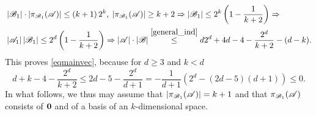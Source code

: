         \begin{align}
            & \left|{\mathscr{B}}_1\right|\cdot\left|\pi_{{\mathscr{B}}_1}({\mathscr{A}})\right|\leq\left(k+1\right)2^k,\;\left|\pi_{{\mathscr{B}}_1}({\mathscr{A}})\right|\geq k+2 \Rightarrow \left|{\mathscr{B}}_1\right| \leq 2^k\left(1-\frac{1}{k+2}\right) \Rightarrow \nonumber \\
            & \left|{\mathscr{A}}_1\right|\left|{\mathscr{B}}_1\right| \leq 2^d\left(1-\frac{1}{k+2}\right) \Rightarrow \left|{\mathscr{A}}\right|\cdot\left|{\mathscr{B}}\right|\stackrel{\eqref{general_ind}}{\leq} d 2^d + 4d-4- \frac{2^d}{k+2}-(d-k). \nonumber
        \end{align}
        This proves \eqref{eqmainvec}, because for $d \geq 3$ and $k < d$
        \begin{equation*}
            d+k-4-\frac{2^d}{k+2}\leq2d-5-\frac{2^d}{d+1}=-\frac{1}{d+1}\left(2^d - (2d-5)(d+1)\right)\leq 0.
        \end{equation*}
In what follows, we thus may assume that $|\pi_{{\mathscr{B}}_1}({\mathscr{A}})|=k+1$ and that $\pi_{{\mathscr{B}}_1}({\mathscr{A}})$ consists of $\mathbf{0}$ and of a basis of an $k$-dimensional space.
        
